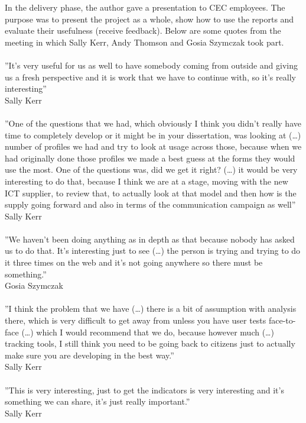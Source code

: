 In the delivery phase, the author gave a presentation to CEC employees. The purpose was to present the project as a whole, show how to use the reports and evaluate their usefulness (receive feedback). Below are some quotes from the meeting in which Sally Kerr, Andy Thomson and Gosia Szymczak took part.\\\\
''It's very useful for us as well to have somebody coming from outside and giving us a fresh perspective and it is work that we have to continue with, so it's really interesting''\\
Sally Kerr\\\\
''One of the questions that we had, which obviously I think you didn't really have time to completely develop or it might be in your dissertation, was looking at (…) number of profiles we had and try to look at usage across those, because when we had originally done those profiles we made a best guess at the forms they would use the most. One of the questions was, did we get it right? (…) it would be very interesting to do that, because I think we are at a stage, moving with the new ICT supplier, to review that, to actually look at that model and then how is the supply going forward and also in terms of the communication campaign as well''\\
Sally Kerr\\\\
''We haven't been doing anything as in depth as that because nobody has asked us to do that. It's interesting just to see (…) the person is trying and trying to do it three times on the web and it's not going anywhere so there must be something.''\\
Gosia Szymczak\\\\
''I think the problem that we have (…) there is a bit of assumption with analysis there, which is very difficult to get away from unless you have user tests face-to-face (…) which I would recommend that we do, because however much (…) tracking tools, I still think you need to be going back to citizens just to actually make sure you are developing in the best way.''\\
Sally Kerr\\\\
''This is very interesting, just to get the indicators is very interesting and it's something we can share, it's just really important.''\\
Sally Kerr\\\\
